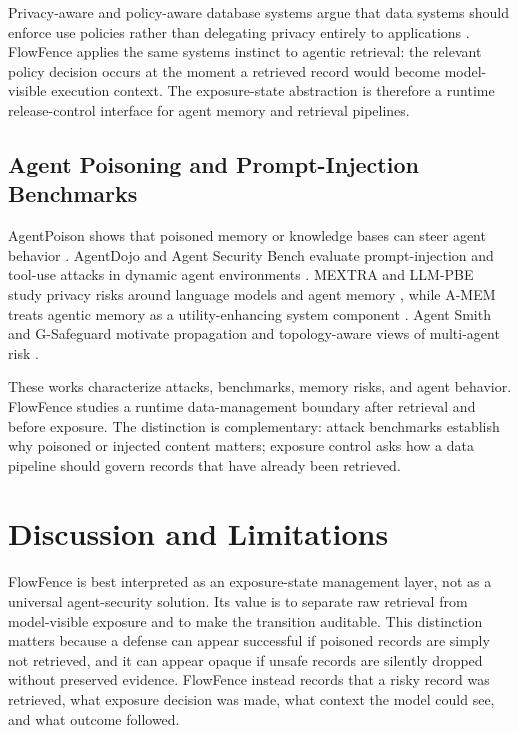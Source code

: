 \documentclass[conference]{IEEEtran}
\begin{document}
Privacy-aware and policy-aware database systems argue that data systems should enforce use policies rather than delegating privacy entirely to applications \cite{agrawal2002hippocratic,byun2008purpose,chaudhuri2011accessprivacy}. FlowFence applies the same systems instinct to agentic retrieval: the relevant policy decision occurs at the moment a retrieved record would become model-visible execution context. The exposure-state abstraction is therefore a runtime release-control interface for agent memory and retrieval pipelines.

\subsection{Agent Poisoning and Prompt-Injection Benchmarks}

AgentPoison shows that poisoned memory or knowledge bases can steer agent behavior \cite{agentpoison}. AgentDojo and Agent Security Bench evaluate prompt-injection and tool-use attacks in dynamic agent environments \cite{agentdojo,asb}. MEXTRA and LLM-PBE study privacy risks around language models and agent memory \cite{mextra,llmpbe}, while A-MEM treats agentic memory as a utility-enhancing system component \cite{amem}. Agent Smith and G-Safeguard motivate propagation and topology-aware views of multi-agent risk \cite{agentsmith,gsafeguard}.

These works characterize attacks, benchmarks, memory risks, and agent behavior. FlowFence studies a runtime data-management boundary after retrieval and before exposure. The distinction is complementary: attack benchmarks establish why poisoned or injected content matters; exposure control asks how a data pipeline should govern records that have already been retrieved.

\section{Discussion and Limitations}

FlowFence is best interpreted as an exposure-state management layer, not as a universal agent-security solution. Its value is to separate raw retrieval from model-visible exposure and to make the transition auditable. This distinction matters because a defense can appear successful if poisoned records are simply not retrieved, and it can appear opaque if unsafe records are silently dropped without preserved evidence. FlowFence instead records that a risky record was retrieved, what exposure decision was made, what context the model could see, and what outcome followed.
\end{document}
